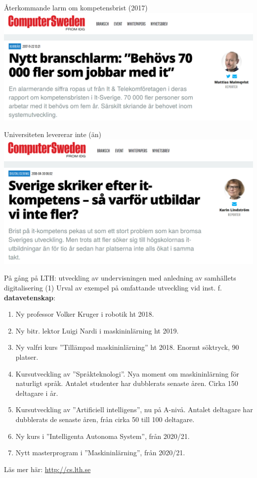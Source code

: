 \documentclass[aspectratio=169]{beamer}
\newenvironment{Slide}[1]%
  {\begin{frame}[environment=Slide]{#1}}
  {\end{frame}}%
\begin{document}
\begin{Slide}{Återkommande larm om kompetensbrist (2017)}
\includegraphics[height=0.75\textheight]{../../img/kompetenslarm-cs}
\end{Slide}




\begin{Slide}{Universiteten levererar inte (än)}
\includegraphics[height=0.75\textheight]{../../img/utbilda-fler}
\end{Slide}


\begin{Slide}{På gång på LTH: utveckling av undervisningen med anledning av samhällets digitalisering (1)}
  Urval av exempel på omfattande utveckling vid inst. f. \textbf{datavetenskap}: 
  \begin{enumerate}
    \item Ny professor Volker Kruger i robotik ht 2018. 
    \item Ny bitr. lektor Luigi Nardi i maskininlärning ht 2019. 
    \item Ny valfri kurs ''Tillämpad maskininlärning'' ht 2018. Enormt söktryck, 90 platser.
    \item Kursutveckling av ''Språkteknologi''. Nya moment om maskininlärning för naturligt språk.  Antalet studenter har dubblerats senaste åren. Cirka 150 deltagare i år.
    \item Kursutveckling av ''Artificiell intelligens'', nu på A-nivå. Antalet deltagare har dubblerats de senaste åren, från cirka 50 till 100 deltagare.
    \item Ny kurs i ''Intelligenta Autonoma System'', från 2020/21.
    \item Nytt masterprogram i ''Maskininlärning'', från 2020/21.
  \end{enumerate}
  Läs mer här: \url{http://cs.lth.se}
\end{Slide}
\end{document}
